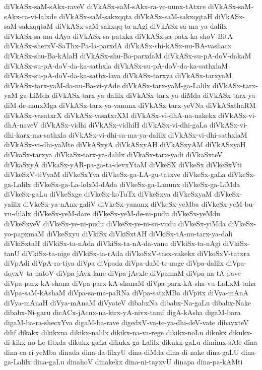 {diVkASx-saM-sAkx-raveV
diVkASx-saM-sAkx-ra-ve-nunx-tAtxre
diVkASx-saM-sAkx-ra-vi-lalxde
diVkASx-saM-sakxqqta
diVkASx-saM-sakxqqtaH
diVkASx-saM-sakxqqtaM
diVkASx-saM-sakxqq-ta-nAgi
diVkASx-sa-ma-ya-dalilx
diVkASx-sa-mu-dAya
diVkASx-sa-patxka
diVkASx-sa-patx-ka-shoV-BitA
diVkASx-sherxV-SaThx-Pa-la-parxdA
diVkASx-shi-kASx-nu-BA-vashacx
diVkASx-shu-Ba-kAlaH
diVkASx-shu-Ba-parxdaM
diVkASx-su-pA-doV-dakaM
diVkASx-su-pA-doV-da-ka-sathxla
diVkASx-su-pA-doV-da-ka-sathxlaM
diVkASx-su-pA-doV-da-ka-sathx-lava
diVkASx-tarxya
diVkASx-tarxyaM
diVkASx-tarx-yaM-da-nu-Ba-vi-yAde
diVkASx-tarx-yaM-ga-Lalilx
diVkASx-tarx-yaM-ga-LiMda
diVkASx-tarx-ya-dalilx
diVkASx-tarx-ya-diMda
diVkASx-tarx-ya-diM-de-nanxMga
diVkASx-tarx-ya-vanunx
diVkASx-tarx-yeVNa
diVkASxthaRM
diVkASx-vasatxrX
diVkASx-vasatxrXM
diVkASx-vi-dhA-na-nakekx
diVkASx-vi-dhA-naveV
diVkASx-vidhi
diVkASx-vidhiH
diVkASx-vi-dhi-gaLa
diVkASx-vi-dhi-karx-ma-sathxla
diVkASx-vi-dhi-sa-ma-ya-dalilx
diVkASx-vi-dhi-sathxlaM
diVkASx-vi-dhi-yaMte
diVkASxyA
diVkASxyAH
diVkASxyAM
diVkASxyaH
diVkaSx-tarxya
diVkaSx-tarx-ya-dalilx
diVkaSx-tarx-yadi
diVkaSxteV
diVkaSxyA
diVkaSx-yAR-pa-ga-ta-devxYtaM
diVkeSX
diVkeSx
diVkeSxVti
diVkeSxV-tiVyaM
diVkeSxYva
diVkeSx-ga-LA-gu-tatxve
diVkeSx-gaLa
diVkeSx-ga-Lalilx
diVkeSx-ga-La-lolxM-dAda
diVkeSx-ga-Lanunx
diVkeSx-ga-LiMda
diVkeSx-gaLu
diVkeSxge
diVkeSx-koTuTx
diVkeSxya
diVkeSxyaM
diVkeSx-yalilx
diVkeSx-ya-nAnx-galiV
diVkeSx-yanunx
diVkeSx-yeMba
diVkeSx-yeM-bu-vu-dilalx
diVkeSx-yeM-dare
diVkeSx-yeM-de-ni-pudu
diVkeSx-yeMdu
diVkeSxyeV
diVkeSx-ye-ni-pudu
diVkeSx-ye-ni-su-vudu
diVkeSx-yiMda
diVkeSx-yo-papxmaM
diVkeSxyu
diVkfSx
diVkiSxtAH
diVkiSx-tA-nu-tarx-ya-dali
diVkiSxtaH
diVkiSx-ta-nAda
diVkiSx-ta-nA-da-vanu
diVkiSx-ta-nAgi
diVkiSx-tanU
diVkiSx-ta-nige
diVkiSx-ta-rAda
diVkoSxV-tasx-vakekx
diVkoSxV-tatxra
diVpAdi
diVpA-ra-tiya
diVpa
diVpada
diVpa-daM-te-nage
diVpa-dalilx
diVpa-doyxV-ta-natoV
diVpa-jAvx-lane
diVpa-jAvxle
diVpamaM
diVpa-na-tA-pave
diVpa-parx-kA-shana
diVpa-parx-kA-shanaM
diVpa-parx-kA-sha-vu-LaLxM-taha
diVpa-saM-kAshaM
diVpa-sa-ma-paRNa
diVpa-satxMBa
diVpitx
diVya-mAnA
diVya-mAnaH
diVya-mAnaM
diVyateV
dibabxNa
dibabx-Na-gaLu
dibabx-Nake
dibabx-Ni-garu
dicACx-jAcnx-na-kirx-yA-nivx-tamf
digA-kAsha
digaM-bara
digaM-ba-ra-shecxYva
digaM-ba-rave
digedxV-va-te-ya-dhi-deV-vate
dihayxteV
dihf
dikakx
dikikxna
dikikx-nalilx
dikikx-na-va-rege
dikikx-noLu
dikukx
dikukx-di-kikx-no-Le-titxda
dikukx-gaLa
dikukx-ga-Lalilx
dikukx-gaLu
dimimx-sAle
dina
dina-ca-ri-yeMba
dinada
dina-da-lilxyU
dina-diMda
dina-di-nake
dina-gaLU
dina-ga-Lalilx
dina-gaLu
dinahoV
dinakekx
dina-ni-tayxvU
dinapa
dina-pa-kAMti
}
